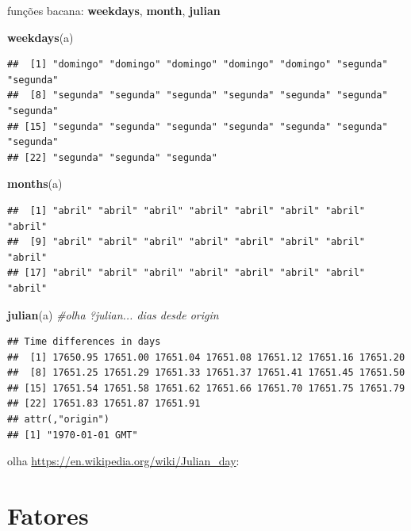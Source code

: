 \documentclass[]{book}
\newenvironment{Shaded}{\begin{snugshade}}{\end{snugshade}}
\newcommand{\KeywordTok}[1]{\textcolor[rgb]{0.13,0.29,0.53}{\textbf{#1}}}
\newcommand{\CommentTok}[1]{\textcolor[rgb]{0.56,0.35,0.01}{\textit{#1}}}
\newcommand{\NormalTok}[1]{#1}
\theoremstyle{definition}
\theoremstyle{definition}
\theoremstyle{definition}
\theoremstyle{remark}
\begin{document}
funções bacana: \textbf{weekdays}, \textbf{month}, \textbf{julian}

\begin{Shaded}
\begin{Highlighting}[]
\KeywordTok{weekdays}\NormalTok{(a)}
\end{Highlighting}
\end{Shaded}

\begin{verbatim}
##  [1] "domingo" "domingo" "domingo" "domingo" "domingo" "segunda" "segunda"
##  [8] "segunda" "segunda" "segunda" "segunda" "segunda" "segunda" "segunda"
## [15] "segunda" "segunda" "segunda" "segunda" "segunda" "segunda" "segunda"
## [22] "segunda" "segunda" "segunda"
\end{verbatim}

\begin{Shaded}
\begin{Highlighting}[]
\KeywordTok{months}\NormalTok{(a)}
\end{Highlighting}
\end{Shaded}

\begin{verbatim}
##  [1] "abril" "abril" "abril" "abril" "abril" "abril" "abril" "abril"
##  [9] "abril" "abril" "abril" "abril" "abril" "abril" "abril" "abril"
## [17] "abril" "abril" "abril" "abril" "abril" "abril" "abril" "abril"
\end{verbatim}

\begin{Shaded}
\begin{Highlighting}[]
\KeywordTok{julian}\NormalTok{(a) }\CommentTok{#olha ?julian... dias desde origin}
\end{Highlighting}
\end{Shaded}

\begin{verbatim}
## Time differences in days
##  [1] 17650.95 17651.00 17651.04 17651.08 17651.12 17651.16 17651.20
##  [8] 17651.25 17651.29 17651.33 17651.37 17651.41 17651.45 17651.50
## [15] 17651.54 17651.58 17651.62 17651.66 17651.70 17651.75 17651.79
## [22] 17651.83 17651.87 17651.91
## attr(,"origin")
## [1] "1970-01-01 GMT"
\end{verbatim}

olha \url{https://en.wikipedia.org/wiki/Julian_day}:

\section{Fatores}\label{fatores}
\end{document}

